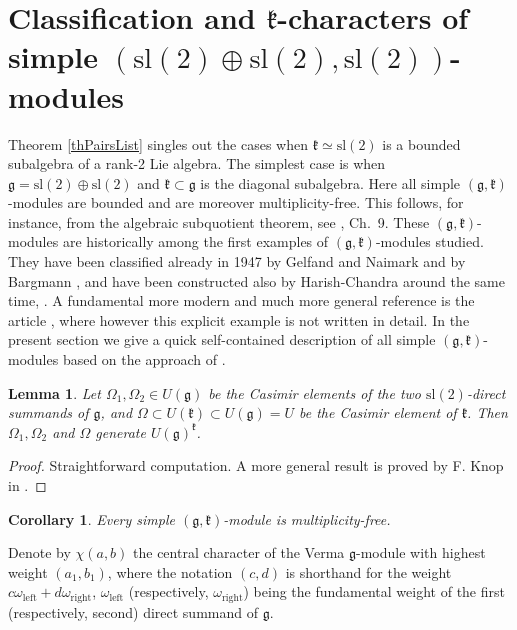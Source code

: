 \documentclass[12pt]{amsart}
\theoremstyle{plain} %
\newtheorem{lemma}[definition]{Lemma}
\newtheorem{corollary}[definition]{Corollary}
\renewcommand{\sl}{\mathrm{sl}}
\newcommand{\kk}{\mathfrak{k}}
\renewcommand{\gg}{\mathfrak{g}}
\newcommand{\refth}[1]{Theorem \ref{#1}}
\begin{document}
\section{Classification and $\kk$-characters of simple $(\sl(2)\oplus\sl(2),\sl(2))$-modules}\label{secKchars}

\refth{thPairsList} singles out the cases when $\kk\simeq\sl(2)$ is a bounded subalgebra of a rank-2 Lie algebra. The simplest case is when $\gg=\sl(2)\oplus\sl(2)$ and $\kk\subset\gg$ is the diagonal subalgebra. Here all simple $(\gg,\kk)$-modules are bounded and are moreover multiplicity-free. This follows, for instance, from
the algebraic subquotient theorem, see \cite{Dix}, Ch.~9. These $(\gg,\kk)$-modules are historically among the first examples of $(\gg,\kk)$-modules studied. They have been classified already in 1947 by Gelfand and Naimark
\cite{GN} and by Bargmann \cite{B}, and have been constructed also by Harish-Chandra
around the same time, \cite{HC}.
A fundamental more modern and much more general
reference is the article \cite{BG}, where however this explicit
example is not written in detail.
In the present section we give a quick self-contained description of
all simple $(\gg,\kk)$-modules based on the approach of \cite{BG}.

\begin{lemma}\label{lmc}
Let $\Omega_1, \Omega_2\in U(\gg)$ be the Casimir elements of the two $\sl(2)$-direct summands of $\gg$, and $\Omega\subset U(\kk)\subset U(\gg)=U$ be the Casimir element of $\kk$. Then $\Omega_1, \Omega_2$ and $\Omega$ generate $U(\gg)^{\kk}$.
\end{lemma}
\begin{proof}
Straightforward computation. A more general result is proved by F. Knop in \cite{Kn1}.
\end{proof}

\begin{corollary}
Every simple $(\gg,\kk)$-module is multiplicity-free.
\end{corollary}

Denote by $\chi(a,b)$ the central character of the Verma $\gg$-module
with highest weight $(a_1,b_1)$, where the notation $(c,d)$ is shorthand for the weight $c\omega_{\mathrm{left}}+d\omega_{\mathrm{right}}$, $\omega_{\mathrm{left}}$ (respectively, $\omega_{\mathrm{right}}$) being the fundamental weight of the first (respectively, second) direct summand of $\gg$.
\end{document}
